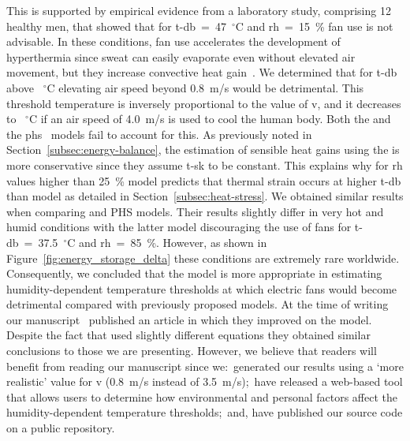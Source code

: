 This is supported by empirical evidence from a laboratory study, comprising 12 healthy men, that showed that for \ac{t-db}~=~47~$^{\circ}$C and \ac{rh}~=~15~\% fan use is not advisable.
In these conditions, fan use accelerates the development of hyperthermia since sweat can easily evaporate even without elevated air movement, but they increase convective heat gain~\cite{Morris2021a}.
We determined that for \ac{t-db} above ~$^{\circ}$C elevating air speed beyond 0.8~m/s would be detrimental.
This threshold temperature is inversely proportional to the value of \ac{v}, and it decreases to ~$^{\circ}$C if an air speed of 4.0~m/s is used to cool the human body.
Both the  and the \ac{phs}~\cite{iso7933} models fail to account for this.
As previously noted in Section~\ref{subsec:energy-balance}, the estimation of sensible heat gains using the  is more conservative since they assume \ac{t-sk} to be constant.
This explains why for \ac{rh} values higher than 25~\%  model predicts that thermal strain occurs at higher \ac{t-db} than  model as detailed in Section~\ref{subsec:heat-stress}.
We obtained similar results when comparing  and PHS models.
Their results slightly differ in very hot and humid conditions with the latter model discouraging the use of fans for \ac{t-db}~=~37.5~$^{\circ}$C and \ac{rh}~=~85~\%\@.
However, as shown in Figure~\ref{fig:energy_storage_delta} these conditions are extremely rare worldwide.
Consequently, we concluded that the  model is more appropriate in estimating humidity-dependent temperature thresholds at which electric fans would become detrimental compared with previously proposed models.
At the time of writing our manuscript~ published an article in which they improved on the  model.
Despite the fact that  used slightly different equations they obtained similar conclusions to those we are presenting.
However, we believe that readers will benefit from reading our manuscript since we:\
generated our results using a `more realistic' value for \ac{v} (0.8~m/s instead of 3.5~m/s);\
have released a web-based tool that allows users to determine how environmental and personal factors affect the humidity-dependent temperature thresholds;\
and, have published our source code on a public repository.

